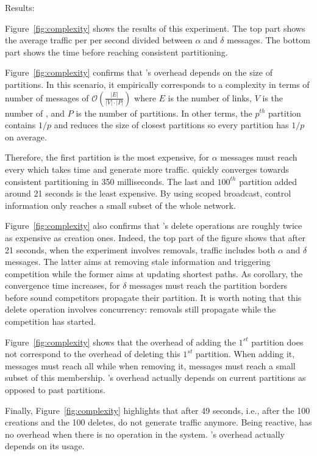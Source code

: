 \begin{asparadesc}
\item [Results:]

Figure~\ref{fig:complexity} shows the results of this experiment. The
top part shows the average traffic per \process per second divided
between $\alpha$ and $\delta$ messages. The bottom part shows the time
before reaching consistent partitioning.

\noindent Figure~\ref{fig:complexity} confirms that \NAME's overhead
depends on the size of partitions. In this scenario, it empirically
corresponds to a complexity in terms of number of messages of
$\mathcal{O}(\frac{|E|}{|V|\cdot|P|})$ where $E$ is the number of
links, $V$ is the number of \processes, and $P$ is the number of
partitions. In other terms, the $p^{th}$ partition contains $1/p$
\processes and reduces the size of closest partitions so every
partition has $1/p$ \processes on average.
  
\noindent Therefore, the first partition is the most expensive, for
$\alpha$ messages must reach every \process which takes time and
generate more traffic.  \NAME quickly converges towards consistent
partitioning in 350 milliseconds.
The last and $100^{th}$ partition
added around 21 seconds is the least expensive. By using scoped
broadcast, control information only reaches a small subset of the
whole network.

\noindent Figure~\ref{fig:complexity} also confirms that \NAME's
delete operations are roughly twice as expensive as creation
ones. Indeed, the top part of the figure shows that after 21 seconds,
when the experiment involves removals, traffic includes both
$\alpha$ and $\delta$ messages. The latter aims at removing stale
information and triggering competition while the former aims at
updating shortest paths. As corollary, the convergence time increases,
for $\delta$ messages must reach the partition borders before sound
competitors propagate their partition. It is worth noting that this
delete operation involves concurrency: removals still propagate while
the competition has started.

\noindent Figure~\ref{fig:complexity} shows that the overhead of
adding the $1^{st}$ partition does not correspond to the overhead of
deleting this $1^{st}$ partition. When adding it, messages must reach
all \processes while when removing it, messages must reach a small
subset of this membership.  \NAME's overhead actually depends on
current partitions as opposed to past partitions.

\noindent Finally, Figure~\ref{fig:complexity} highlights that after
49 seconds, i.e., after the 100 creations and the 100 deletes, \processes
do not generate traffic anymore. Being reactive, \NAME has no overhead
 when there is no operation in the system. \NAME's overhead actually
depends on its usage.

\end{asparadesc}

